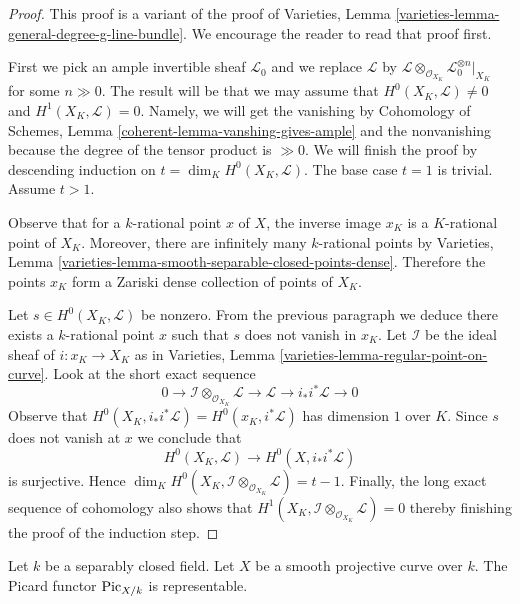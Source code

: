 \begin{proof}
This proof is a variant of the proof of
Varieties, Lemma \ref{varieties-lemma-general-degree-g-line-bundle}.
We encourage the reader to read that proof first.

\medskip\noindent
First we pick an ample invertible sheaf $\mathcal{L}_0$ and
we replace $\mathcal{L}$ by
$\mathcal{L} \otimes_{\mathcal{O}_{X_K}} \mathcal{L}_0^{\otimes n}|_{X_K}$
for some $n \gg 0$. The result will be that we may assume that
$H^0(X_K, \mathcal{L}) \not = 0$ and $H^1(X_K, \mathcal{L}) = 0$.
Namely, we will get the vanishing by Cohomology of Schemes, Lemma
\ref{coherent-lemma-vanshing-gives-ample} and the nonvanishing because
the degree of the tensor product is $\gg 0$.
We will finish the proof by descending induction on
$t = \dim_K H^0(X_K, \mathcal{L})$. The base case $t = 1$ is trivial.
Assume $t > 1$.

\medskip\noindent
Observe that for a $k$-rational point $x$ of $X$, the inverse image $x_K$
is a $K$-rational point of $X_K$. Moreover, there are infinitely many
$k$-rational points by Varieties, Lemma
\ref{varieties-lemma-smooth-separable-closed-points-dense}. Therefore
the points $x_K$ form a Zariski dense collection of points of $X_K$.

\medskip\noindent
Let $s \in H^0(X_K, \mathcal{L})$ be nonzero. From the previous paragraph
we deduce there exists a $k$-rational
point $x$ such that $s$ does not vanish in $x_K$. Let $\mathcal{I}$
be the ideal sheaf of $i : x_K \to X_K$ as in
Varieties, Lemma \ref{varieties-lemma-regular-point-on-curve}. Look at the
short exact sequence
$$
0 \to \mathcal{I} \otimes_{\mathcal{O}_{X_K}} \mathcal{L} \to
\mathcal{L} \to i_*i^*\mathcal{L} \to 0
$$
Observe that $H^0(X_K, i_*i^*\mathcal{L}) = H^0(x_K, i^*\mathcal{L})$
has dimension $1$ over $K$. Since $s$ does not vanish at $x$ we conclude that
$$
H^0(X_K, \mathcal{L}) \longrightarrow H^0(X, i_*i^*\mathcal{L})
$$
is surjective. Hence
$\dim_K H^0(X_K, \mathcal{I} \otimes_{\mathcal{O}_{X_K}} \mathcal{L}) = t - 1$.
Finally, the long exact sequence of cohomology also shows that
$H^1(X_K, \mathcal{I} \otimes_{\mathcal{O}_{X_K}} \mathcal{L}) = 0$
thereby finishing the proof of the induction step.
\end{proof}

\begin{proposition}
\label{proposition-pic-curve}
Let $k$ be a separably closed field. Let $X$ be a smooth projective
curve over $k$. The Picard functor $\mathrm{Pic}_{X/k}$ is representable.
\end{proposition}

